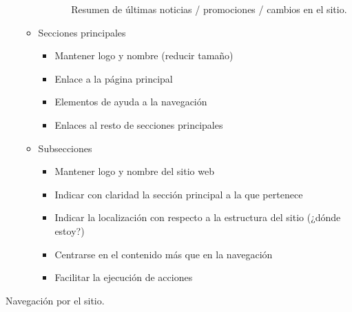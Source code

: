 \documentclass[12pt, twoside, openright]{report} %
\begin{document}
\begin{itemize}
\begin{itemize}
\begin{itemize}
\begin{itemize}
                Resumen de últimas noticias / promociones / cambios en
                el sitio.
            \end{itemize}
        \end{itemize}
      \item Secciones principales
        \begin{itemize}
          \item
            Mantener logo y nombre (reducir tamaño)
          \item
            Enlace a la página principal
          \item
            Elementos de ayuda a la navegación
          \item
            Enlaces al resto de secciones principales
        \end{itemize}
      \item Subsecciones
        \begin{itemize}
          \item
            Mantener logo y nombre del sitio web
          \item
            Indicar con claridad la sección principal a la que pertenece
          \item
            Indicar la localización con respecto a la estructura del
            sitio (¿dónde estoy?)
          \item
            Centrarse en el contenido más que en la navegación
          \item
            Facilitar la ejecución de acciones
        \end{itemize}
    \end{itemize}
\end{itemize}

      
Navegación por el sitio.
\end{document}
